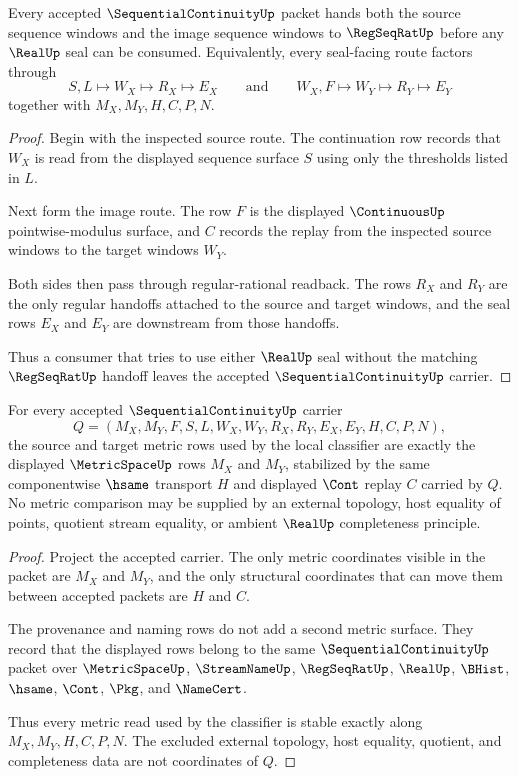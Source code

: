 \begin{theorem}
\label{thm:sequential-continuity-cauchy-handoff}
Every accepted $\SequentialContinuityUp$ packet hands both the source sequence windows and the image sequence windows to $\RegSeqRatUp$ before any $\RealUp$ seal can be consumed. Equivalently, every seal-facing route factors through
$$
S,L\longmapsto W_X\longmapsto R_X\longmapsto E_X
\qquad\text{and}\qquad
W_X,F\longmapsto W_Y\longmapsto R_Y\longmapsto E_Y
$$
together with $M_X,M_Y,H,C,P,N$.
\end{theorem}
\begin{proof}
Begin with the inspected source route. The continuation row records that $W_X$ is read from the displayed sequence surface $S$ using only the thresholds listed in $L$.

Next form the image route. The row $F$ is the displayed $\ContinuousUp$ pointwise-modulus surface, and $C$ records the replay from the inspected source windows to the target windows $W_Y$.

Both sides then pass through regular-rational readback. The rows $R_X$ and $R_Y$ are the only regular handoffs attached to the source and target windows, and the seal rows $E_X$ and $E_Y$ are downstream from those handoffs.

Thus a consumer that tries to use either $\RealUp$ seal without the matching $\RegSeqRatUp$ handoff leaves the accepted $\SequentialContinuityUp$ carrier.
\end{proof}

\begin{theorem}
\label{thm:sequential-continuity-metric-row-stability}
For every accepted $\SequentialContinuityUp$ carrier
$$
Q=(M_X,M_Y,F,S,L,W_X,W_Y,R_X,R_Y,E_X,E_Y,H,C,P,N),
$$
the source and target metric rows used by the local classifier are exactly the displayed $\MetricSpaceUp$ rows $M_X$ and $M_Y$, stabilized by the same componentwise $\hsame$ transport $H$ and displayed $\Cont$ replay $C$ carried by $Q$. No metric comparison may be supplied by an external topology, host equality of points, quotient stream equality, or ambient $\RealUp$ completeness principle.
\end{theorem}
\begin{proof}
Project the accepted carrier. The only metric coordinates visible in the packet are $M_X$ and $M_Y$, and the only structural coordinates that can move them between accepted packets are $H$ and $C$.

The provenance and naming rows do not add a second metric surface. They record that the displayed rows belong to the same $\SequentialContinuityUp$ packet over $\MetricSpaceUp$, $\StreamNameUp$, $\RegSeqRatUp$, $\RealUp$, $\BHist$, $\hsame$, $\Cont$, $\Pkg$, and $\NameCert$.

Thus every metric read used by the classifier is stable exactly along $M_X,M_Y,H,C,P,N$. The excluded external topology, host equality, quotient, and completeness data are not coordinates of $Q$.
\end{proof}

